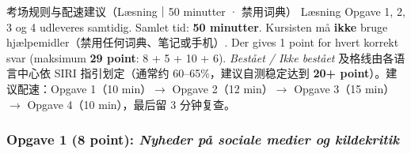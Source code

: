 

\begin{tipbox}{考场规则与配速建议（Læsning｜50 minutter · 禁用词典）}
\small
Læsning Opgave 1, 2, 3 og 4 udleveres samtidig. Samlet tid: \textbf{50 minutter}. Kursisten må \textbf{ikke} bruge hjælpemidler（禁用任何词典、笔记或手机）. Der gives 1 point for hvert korrekt svar (maksimum \textbf{29 point}: 8 + 5 + 10 + 6). \textit{Bestået / Ikke bestået} 及格线由各语言中心依 SIRI 指引划定（通常约 60--65\%，建议自测稳定达到 \textbf{20+ point}）。建议配速：Opgave 1（10 min）$\rightarrow$ Opgave 2（12 min）$\rightarrow$ Opgave 3（15 min）$\rightarrow$ Opgave 4（10 min），最后留 3 分钟复查。
\end{tipbox}

\subsubsection*{Opgave 1 (8 point): \textit{Nyheder på sociale medier og kildekritik}}

